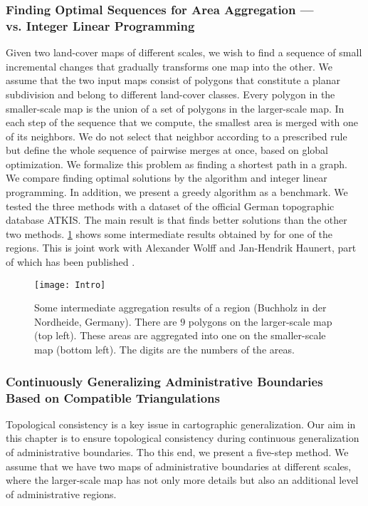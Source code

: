 \subsubsection{Finding Optimal Sequences for Area Aggregation ---\\ 
	\Astar vs. Integer Linear Programming}

Given two land-cover maps of different scales, 
we wish to find a sequence of small incremental
changes that gradually transforms one map into the other.
We assume that the two input maps consist of
polygons that constitute a planar subdivision and belong to
different land-cover classes. 
Every polygon in the smaller-scale map
is the union of a set of polygons in the larger-scale map. 
In each step of the sequence that we compute, 
the smallest area is merged with one of its neighbors. 
We do not select that neighbor according to a prescribed rule 
but define the whole sequence of pairwise merges at once, 
based on global optimization.
We formalize this problem as 
finding a shortest path in a graph.
We compare finding optimal solutions by the \Astar algorithm 
and integer linear programming.
In addition, we present a greedy algorithm 
as a benchmark.
We tested the three methods with a
dataset of the official German topographic database ATKIS.
The main result is that 
\Astar finds better solutions than the other two methods.
\fig\ref{fig:Intro_AreaAgg_Case612} shows some intermediate 
results obtained by \Astar for one of the regions.
This is joint work with Alexander Wolff and Jan-Hendrik Haunert,
part of which has been published \cite{Peng2017AStar}.


\begin{figure}[tb]
	\centering
	\texttt{[image: Intro]}
	\caption{Some intermediate aggregation results of 
		a region (Buchholz in der Nordheide, Germany). 
		There are $9$ polygons on 
		the larger-scale map (top left). 
		These areas are aggregated into one 
		on the smaller-scale map (bottom left). 
		The digits are the numbers of the areas.
}
	\label{fig:Intro_AreaAgg_Case612}
\end{figure}

\subsubsection{Continuously Generalizing Administrative Boundaries\\
	Based on Compatible Triangulations}

Topological consistency is a key issue 
in cartographic generalization.
Our aim in this chapter is to ensure topological consistency  
during continuous generalization of administrative boundaries.
Tho this end, we present a five-step method.
We assume that we have two maps of administrative
boundaries at different scales, where the larger-scale map has 
not
only more details but also an additional level of administrative
regions.

